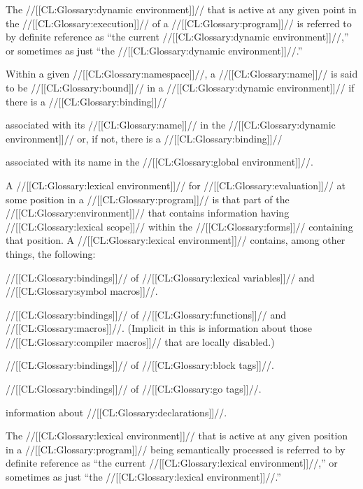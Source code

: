 The //[[CL:Glossary:dynamic environment]]// that is active at any given point 
in the //[[CL:Glossary:execution]]// of a //[[CL:Glossary:program]]// is referred to by 
definite reference as ``the current //[[CL:Glossary:dynamic environment]]//,''
or sometimes as just ``the //[[CL:Glossary:dynamic environment]]//.''

Within a given //[[CL:Glossary:namespace]]//,
a //[[CL:Glossary:name]]// is said to be //[[CL:Glossary:bound]]//
in a //[[CL:Glossary:dynamic environment]]// if there is a //[[CL:Glossary:binding]]// 

associated with its //[[CL:Glossary:name]]// in the //[[CL:Glossary:dynamic environment]]// 
or, if not, there is a //[[CL:Glossary:binding]]// 

associated with its name in the //[[CL:Glossary:global environment]]//.

\endsubsubsection%


A //[[CL:Glossary:lexical environment]]// for //[[CL:Glossary:evaluation]]// at some position in a //[[CL:Glossary:program]]//
is that part of the //[[CL:Glossary:environment]]// that contains information having 
//[[CL:Glossary:lexical scope]]// within the //[[CL:Glossary:forms]]// containing that position.
A //[[CL:Glossary:lexical environment]]// contains, among other things, the following:

\beginlist
\item{\bull} //[[CL:Glossary:bindings]]// of //[[CL:Glossary:lexical variables]]// and //[[CL:Glossary:symbol macros]]//.
\item{\bull} //[[CL:Glossary:bindings]]// of //[[CL:Glossary:functions]]// and //[[CL:Glossary:macros]]//.
             (Implicit in this is information about those //[[CL:Glossary:compiler macros]]// 
	      that are locally disabled.)




\item{\bull} //[[CL:Glossary:bindings]]// of //[[CL:Glossary:block tags]]//.
\item{\bull} //[[CL:Glossary:bindings]]// of //[[CL:Glossary:go tags]]//.
\item{\bull} information about //[[CL:Glossary:declarations]]//.
\endlist

The //[[CL:Glossary:lexical environment]]// that is active at any given position
in a //[[CL:Glossary:program]]// being semantically processed is referred to by
definite reference as ``the current //[[CL:Glossary:lexical environment]]//,''
or sometimes as just ``the //[[CL:Glossary:lexical environment]]//.''  

